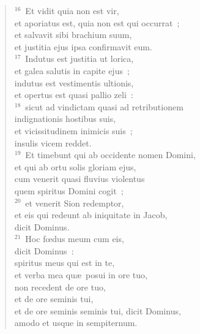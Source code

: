 \begin{flushleft}
\begin{verse}
${}^{16}$~Et vidit quia non est vir,\\ et aporiatus est, quia non est qui occurrat~;\\ et salvavit sibi brachium suum,\\ et justitia ejus ipsa confirmavit eum.\\
${}^{17}$~Indutus est justitia ut lorica,\\ et galea salutis in capite ejus~;\\ indutus est vestimentis ultionis,\\ et opertus est quasi pallio zeli~:\\
${}^{18}$~sicut ad vindictam quasi ad retributionem\\ indignationis hostibus suis,\\ et vicissitudinem inimicis suis~;\\ insulis vicem reddet.\\
${}^{19}$~Et timebunt qui ab occidente nomen Domini,\\ et qui ab ortu solis gloriam ejus,\\ cum venerit quasi fluvius violentus\\ quem spiritus Domini cogit~;\\
${}^{20}$~et venerit Sion redemptor,\\ et eis qui redeunt ab iniquitate in Jacob,\\ dicit Dominus.\\
${}^{21}$~Hoc fœdus meum cum eis,\\ dicit Dominus~:\\ spiritus meus qui est in te,\\ et verba mea qu\ae\ posui in ore tuo,\\ non recedent de ore tuo,\\ et de ore seminis tui,\\ et de ore seminis seminis tui, dicit Dominus,\\ amodo et usque in sempiternum.\end{verse}\end{flushleft}


